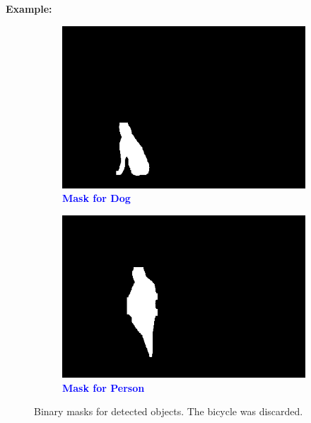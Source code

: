 \documentclass[11pt,letterpaper]{article}
\begin{document}
\noindent
\textbf{Example:}
\begin{figure}[h]
    \centering
    \begin{subfigure}[b]{0.2\textwidth}
        \centering
        \includegraphics[width=\textwidth]{midterm_report/assets/dogMask.jpg}
        \caption{\textcolor{blue}{\textbf{Mask for Dog}}}
        \label{fig:mask_dog}
    \end{subfigure}
    \hfill
    \begin{subfigure}[b]{0.2\textwidth}
        \centering
        \includegraphics[width=\textwidth]{midterm_report/assets/PersonMask.jpg}
        \caption{\textcolor{blue}{\textbf{Mask for Person}}}
        \label{fig:mask_person}
    \end{subfigure}
    \caption{Binary masks for detected objects. The bicycle was discarded.}
    \label{fig:mask_comparison}
\end{figure}
\end{document}
